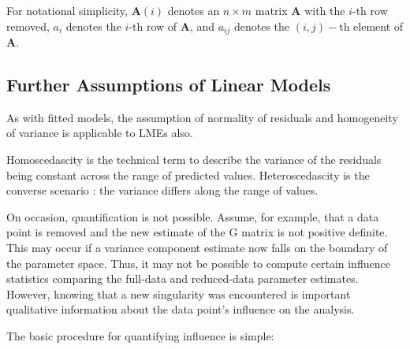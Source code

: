 \documentclass[12pt, a4paper]{report}
\theoremstyle{plain}
\theoremstyle{definition}
\theoremstyle{remark}
\begin{document}
For notational simplicity, $\boldsymbol{A}(i)$ denotes an $n \times m$ matrix $\boldsymbol{A}$ with the $i$-th row
removed, $a_i$ denotes the $i$-th row of $\boldsymbol{A}$, and $a_{ij}$ denotes the $(i, j)-$th element of $\boldsymbol{A}$.
%



\subsection{Further Assumptions of Linear Models}

As with fitted models, the assumption of normality of residuals and homogeneity of variance is applicable to LMEs also. 



Homoscedascity is the technical term to describe the variance of the
residuals being constant across the range of predicted values.
Heteroscedascity is the converse scenario : the variance differs along
the range of values.



On occasion, quantification is not possible. Assume, for example, that a data point is removed
and the new estimate of the G matrix is not positive definite. This may occur if a variance component
estimate now falls on the boundary of the parameter space. Thus, it may not be possible to compute certain
influence statistics comparing the full-data and reduced-data parameter estimates. However, knowing that
a new singularity was encountered is important qualitative information about the data point’s influence on
the analysis.

The basic procedure for quantifying influence is simple:
\end{document}
